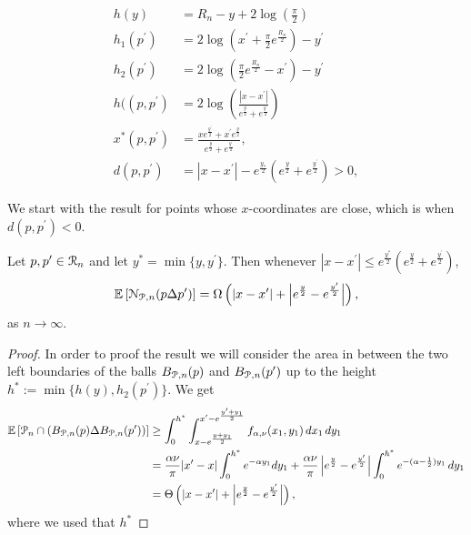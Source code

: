\begin{appendices}
\begin{align}
	h(y) &= R_n - y + 2\log\left(\frac{\pi}{2}\right) \label{eq:def_height_y_P_n}\\
	h_1(p^\prime) &= 2\log\left(x^\prime + \frac{\pi}{2}e^{\frac{R_n}{2}}\right) - y^\prime \label{eq:def_height_left_P_n} \\
	h_2(p^\prime) &= 2\log\left(\frac{\pi}{2}e^{\frac{R_n}{2}} - x^\prime\right) - y^\prime 
		\label{eq:def_height_right_P_n} \\
	h((p,p^\prime) &= 2\log\left(\frac{|x - x^\prime|}{e^{\frac{y}{2}} + e^{\frac{y^\prime}{2}}}\right)\\
	x^\ast(p,p^\prime) &= \frac{x e^{\frac{y^\prime}{2}} + x^\prime e^{\frac{y}{2}}}{e^{\frac{y}{2}} + 	
		e^{\frac{y^\prime}{2}}},\\
	d(p,p^\prime) &= |x - x^\prime| - e^{\frac{y_\ast}{2}}\left(e^{\frac{y}{2}} + e^{\frac{y^\prime}{2}}\right) > 0,
\end{align}

We start with the result for points whose $x$-coordinates are close, which is when $d(p,p^\prime) < 0$.

\begin{lemma}\label{lem:disjoint_neighbors_P_n}
Let $p, p ^\prime \in {\mathcal R}_n$ and let $y^\ast = \min\{y,y^\prime\}$. Then whenever $|x - x^\prime| \le e^{\frac{y^\ast}{2}}\left(e^{\frac{y}{2}} + e^{\frac{y^\prime}{2}}\right)$,
\[
	\mathbb{E}\left[{\mathcal N}_{{\mathcal P},n}(p \Delta p^\prime)\right] 
	= \Omega\left(|x - x^\prime| + \left|e^{\frac{y}{2}} - e^{\frac{y^\prime}{2}}\right|\right),
\]
as $n \to \infty$.
\end{lemma}

\begin{proof}
In order to proof the result we will consider the area in between the two left boundaries of the balls $B_{{\mathcal P},n}(p)$ and
$B_{{\mathcal P},n}(p^\prime)$ up to the height $h^\ast := \min\{h(y), h_2(p^\prime)\}$. We get
\begin{align*}
	\mathbb{E}\left[{\mathcal P}_n \cap \left(B_{{\mathcal P},n}(p) \Delta B_{{\mathcal P},n}(p^\prime)\right)\right]
	&\ge \int_0^{h^\ast} \int_{x - e^{\frac{y + y_1}{2}}}^{x^\prime - e^{\frac{y^\prime + y_1}{2}}} f_{\alpha,\nu}(x_1,y_1)
		\, dx_1 \, dy_1 \\
	&= \frac{\alpha \nu}{\pi}|x^\prime - x| \int_{0}^{h^\ast} e^{-\alpha y_1} dy_1
		+ \frac{\alpha \nu}{\pi}\left|e^{\frac{y}{2}} - e^{\frac{y^\prime}{2}}\right| \int_0^{h^\ast} 
		e^{-(\alpha-\frac{1}{2})y_1} \, dy_1\\
	&= \Theta\left(|x - x^\prime| + \left|e^{\frac{y}{2}} - e^{\frac{y^\prime}{2}}\right|\right),
\end{align*}
where we used that $h^\ast$
\end{proof}


\end{appendices}
